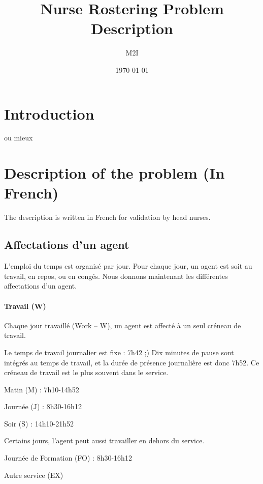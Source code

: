 \documentclass[a4paper]{article}       %
\title{Nurse Rostering Problem Description}
\author{M2I}
\date{\today}
\begin{document}
\maketitle
\tableofcontents
\listoffixmes


\abstract{

}




\section{Introduction}



\citep{burke.ea-04} ou mieux \citet{burke.ea-04}

\appendix

\section{Description of the problem (In French)}
The description is written in French for validation by head nurses.

\subsection{Affectations d'un agent}

L'emploi du temps est organisé par jour.
Pour chaque jour, un agent est soit au travail, en repos, ou en congés.
Nous donnons maintenant les différentes affectations d'un agent.

\paragraph{Travail (W)}
Chaque jour travaillé (Work -- W), un agent est affecté à un seul créneau de travail.

Le temps de travail journalier est fixe : 7h42 ;)
Dix minutes de pause sont intégrés au temps de travail, et la durée de présence journalière est donc 7h52.
Ce créneau de travail est le plus souvent dans le service.
\begin{compactitem}
\item Matin (M) : 7h10-14h52
\item Journée (J) : 8h30-16h12
\item Soir (S) : 14h10-21h52
\end{compactitem}
Certains jours, l'agent peut aussi travailler en dehors du service. 
\begin{compactitem}
\item Journée de Formation (FO) : 8h30-16h12
\item Autre service (EX)
\end{compactitem}
\end{document}
